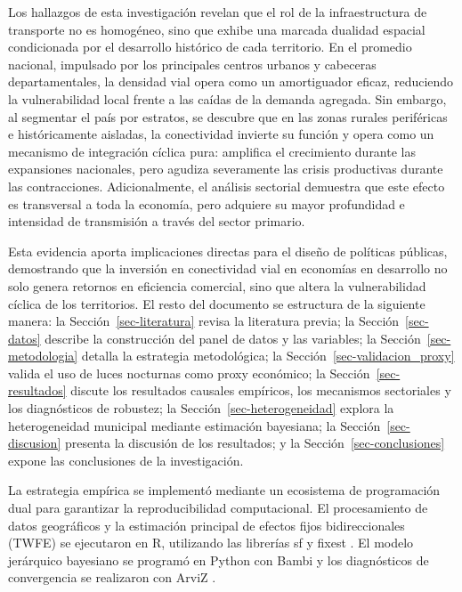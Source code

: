 \documentclass[
  spanish,
  12pt,
  letterpaper]{article}
\begin{document}
Los hallazgos de esta investigación revelan que el rol de la
infraestructura de transporte no es homogéneo, sino que exhibe una
marcada dualidad espacial condicionada por el desarrollo histórico de
cada territorio. En el promedio nacional, impulsado por los principales
centros urbanos y cabeceras departamentales, la densidad vial opera como
un amortiguador eficaz, reduciendo la vulnerabilidad local frente a las
caídas de la demanda agregada. Sin embargo, al segmentar el país por
estratos, se descubre que en las zonas rurales periféricas e
históricamente aisladas, la conectividad invierte su función y opera
como un mecanismo de integración cíclica pura: amplifica el crecimiento
durante las expansiones nacionales, pero agudiza severamente las crisis
productivas durante las contracciones. Adicionalmente, el análisis
sectorial demuestra que este efecto es transversal a toda la economía,
pero adquiere su mayor profundidad e intensidad de transmisión a través
del sector primario.

Esta evidencia aporta implicaciones directas para el diseño de políticas
públicas, demostrando que la inversión en conectividad vial en economías
en desarrollo no solo genera retornos en eficiencia comercial, sino que
altera la vulnerabilidad cíclica de los territorios. El resto del
documento se estructura de la siguiente manera: la
Sección~\ref{sec-literatura} revisa la literatura previa; la
Sección~\ref{sec-datos} describe la construcción del panel de datos y
las variables; la Sección~\ref{sec-metodologia} detalla la estrategia
metodológica; la Sección~\ref{sec-validacion_proxy} valida el uso de
luces nocturnas como proxy económico; la Sección~\ref{sec-resultados}
discute los resultados causales empíricos, los mecanismos sectoriales y
los diagnósticos de robustez; la Sección~\ref{sec-heterogeneidad}
explora la heterogeneidad municipal mediante estimación bayesiana; la
Sección~\ref{sec-discusion} presenta la discusión de los resultados; y
la Sección~\ref{sec-conclusiones} expone las conclusiones de la
investigación.

La estrategia empírica se implementó mediante un ecosistema de
programación dual para garantizar la reproducibilidad computacional. El
procesamiento de datos geográficos y la estimación principal de efectos
fijos bidireccionales (TWFE) se ejecutaron en R, utilizando las
librerías sf \parencite{pebesma2018simple} y fixest
\parencite{berge2018efficient}. El modelo jerárquico bayesiano se
programó en Python con Bambi \parencite{capretto2022bambi} y los
diagnósticos de convergencia se realizaron con ArviZ
\parencite{kumar2019arviz}.
\end{document}
